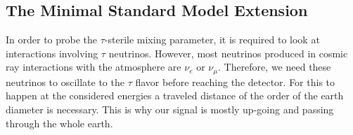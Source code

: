 \subsection{The Minimal Standard Model Extension}

In order to probe the $\tau$-sterile mixing parameter, it is required to look at interactions involving $\tau$ neutrinos. However, most neutrinos produced in cosmic ray interactions with the atmosphere are $\nu_{e}$ or $\nu_{\mu}$. Therefore, we need these neutrinos to oscillate to the $\tau$ flavor before reaching the detector. For this to happen at the considered energies a traveled distance of the order of the earth diameter is necessary. This is why our signal is mostly up-going and passing through the whole earth.

